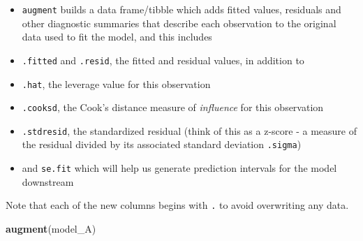 \documentclass[]{book}
\newenvironment{Shaded}{\begin{snugshade}}{\end{snugshade}}
\newcommand{\KeywordTok}[1]{\textcolor[rgb]{0.13,0.29,0.53}{\textbf{#1}}}
\newcommand{\NormalTok}[1]{#1}
\providecommand{\tightlist}{%
  \setlength{\itemsep}{0pt}\setlength{\parskip}{0pt}}
\theoremstyle{definition}
\theoremstyle{definition}
\theoremstyle{definition}
\theoremstyle{remark}
\begin{document}
\begin{itemize}
\tightlist
\item
  \texttt{augment} builds a data frame/tibble which adds fitted values,
  residuals and other diagnostic summaries that describe each
  observation to the original data used to fit the model, and this
  includes
\item
  \texttt{.fitted} and \texttt{.resid}, the fitted and residual values,
  in addition to
\item
  \texttt{.hat}, the leverage value for this observation
\item
  \texttt{.cooksd}, the Cook's distance measure of \emph{influence} for
  this observation
\item
  \texttt{.stdresid}, the standardized residual (think of this as a
  z-score - a measure of the residual divided by its associated standard
  deviation \texttt{.sigma})
\item
  and \texttt{se.fit} which will help us generate prediction intervals
  for the model downstream
\end{itemize}

Note that each of the new columns begins with \texttt{.} to avoid
overwriting any data.

\begin{Shaded}
\begin{Highlighting}[]
\KeywordTok{augment}\NormalTok{(model_A)}
\end{Highlighting}
\end{Shaded}
\end{document}
